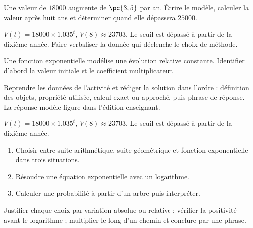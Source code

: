 \begin{activity}
Une valeur de $\num{18000}$ augmente de $\pc{3,5}$ par an. Écrire le modèle, calculer la valeur après huit ans et déterminer quand elle dépassera $\num{25000}$.
\begin{center}\end{center}
\end{activity}
\begin{solution}$V(t)=\num{18000}\times\num{1,035}^t$, $V(8)\approx\num{23703}$. Le seuil est dépassé à partir de la dixième année. Faire verbaliser la donnée qui déclenche le choix de méthode.\end{solution}

\begin{summary}Une fonction exponentielle modélise une évolution relative constante. Identifier d'abord la valeur initiale et le coefficient multiplicateur.\end{summary}

\begin{example}
Reprendre les données de l'activité et rédiger la solution dans l'ordre : définition des objets, propriété utilisée, calcul exact ou approché, puis phrase de réponse. La réponse modèle figure dans l'édition enseignant.
\end{example}
\begin{solution}$V(t)=\num{18000}\times\num{1,035}^t$, $V(8)\approx\num{23703}$. Le seuil est dépassé à partir de la dixième année.\end{solution}

\begin{exercise}[essentiel]
\begin{enumerate}\item Choisir entre suite arithmétique, suite géométrique et fonction exponentielle dans trois situations.\item Résoudre une équation exponentielle avec un logarithme.\item Calculer une probabilité à partir d'un arbre puis interpréter.\end{enumerate}
\end{exercise}
\begin{solution}Justifier chaque choix par variation absolue ou relative ; vérifier la positivité avant le logarithme ; multiplier le long d'un chemin et conclure par une phrase.\end{solution}

